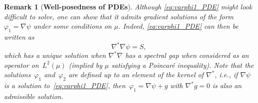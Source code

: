 \documentclass[11pt]{article}
\newtheorem{remark}{Remark}
\theoremstyle{definition}
\begin{document}
\begin{remark}[{\bf Well-posedness of PDEs}]
Although \eqref{eq:varphi1_PDE} might look difficult to solve, one can show that it admits gradient solutions of the form $\varphi_1 = \nabla\psi$ under some conditions on $\mu$. Indeed, \eqref{eq:varphi1_PDE} can then be written as
\begin{equation}
	\nabla^*\nabla \psi = S, \end{equation}
which has a unique solution when $\nabla^*\nabla$ has a spectral gap when considered as an operator on~$L^2(\mu)$ (implied by $\mu$ satisfying a Poincar\'e inequality). Note that the solutions~$\varphi_1$ and~$\varphi_2$ are defined up to an element of the kernel of $\nabla^*$, i.e., if $\nabla\psi$ is a solution to~\eqref{eq:varphi1_PDE}, then~$\varphi_1 = \nabla\psi + g$ with $\nabla^*g = 0$ is also an admissible solution. \end{remark}
\end{document}
